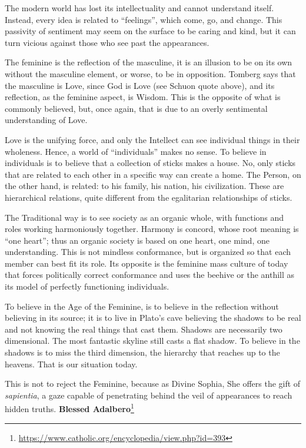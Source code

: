 The modern world has lost its intellectuality and cannot understand itself. Instead, every idea is related to ``feelings'', which come, go, and change. This passivity of sentiment may seem on the surface to be caring and kind, but it can turn vicious against those who see past the appearances.

The feminine is the reflection of the masculine, it is an illusion to be on its own without the masculine element, or worse, to be in opposition. Tomberg says that the masculine is Love, since God is Love (see Schuon quote above), and its reflection, as the feminine aspect, is Wisdom. This is the opposite of what is commonly believed, but, once again, that is due to an overly sentimental understanding of Love.

Love is the unifying force, and only the Intellect can see individual things in their wholeness. Hence, a world of ``individuals'' makes no sense. To believe in individuals is to believe that a collection of sticks makes a house. No, only sticks that are related to each other in a specific way can create a home. The Person, on the other hand, is related: to his family, his nation, his civilization. These are hierarchical relations, quite different from the egalitarian relationships of sticks.

The Traditional way is to see society as an organic whole, with functions and roles working harmoniously together. Harmony is concord, whose root meaning is ``one heart''; thus an organic society is based on one heart, one mind, one understanding. This is not mindless conformance, but is organized so that each member can best fit its role. Its opposite is the feminine mass culture of today that forces politically correct conformance and uses the beehive or the anthill as its model of perfectly functioning individuals.

To believe in the Age of the Feminine, is to believe in the reflection without believing in its source; it is to live in Plato's cave believing the shadows to be real and not knowing the real things that cast them. Shadows are necessarily two dimensional. The most fantastic skyline still casts a flat shadow. To believe in the shadows is to miss the third dimension, the hierarchy that reaches up to the heavens. That is our situation today.

This is not to reject the Feminine, because as Divine Sophia, She offers the gift of \emph{sapientia}, a gaze capable of penetrating behind the veil of appearances to reach hidden truths. \textbf{Blessed Adalbero}\footnote{\url{https://www.catholic.org/encyclopedia/view.php?id=393}}


